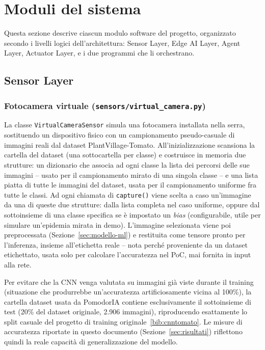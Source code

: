 \section{Moduli del sistema}
\label{sec:moduli}

Questa sezione descrive ciascun modulo software del progetto, organizzato
secondo i livelli logici dell'architettura: Sensor Layer, Edge AI Layer,
Agent Layer, Actuator Layer, e i due programmi che li orchestrano.

\subsection{Sensor Layer}

\subsubsection{Fotocamera virtuale (\texttt{sensors/virtual\_camera.py})}

La classe \texttt{VirtualCameraSensor} simula una fotocamera installata
nella serra, sostituendo un dispositivo fisico con un campionamento
pseudo-casuale di immagini reali dal dataset PlantVillage-Tomato.
All'inizializzazione scansiona la cartella del dataset (una sottocartella
per classe) e costruisce in memoria due strutture: un dizionario che
associa ad ogni classe la lista dei percorsi delle sue immagini -- usato
per il campionamento mirato di una singola classe -- e una lista piatta di
tutte le immagini del dataset, usata per il campionamento uniforme fra
tutte le classi. Ad ogni chiamata di \texttt{capture()} viene scelta a caso
un'immagine da una di queste due strutture: dalla lista completa nel caso
uniforme, oppure dal sottoinsieme di una classe specifica se è impostato un
\emph{bias} (configurabile, utile per simulare un'epidemia mirata in demo).
L'immagine selezionata viene poi preprocessata (Sezione~\ref{sec:modello-ml})
e restituita come tensore pronto per l'inferenza, insieme all'etichetta
reale -- nota perché proveniente da un dataset etichettato, usata solo per
calcolare l'accuratezza nel PoC, mai fornita in input alla rete.

\begin{notebox}
Per evitare che la CNN venga valutata su immagini già viste durante il
training (situazione che produrrebbe un'accuratezza artificiosamente vicina
al 100\%), la cartella dataset usata da PomodorIA contiene esclusivamente il
sottoinsieme di test (20\% del dataset originale, 2.906 immagini),
riproducendo esattamente lo split casuale del progetto di training
originale~\ref{bib:cnntomato}. Le misure di accuratezza riportate in
questo documento (Sezione~\ref{sec:risultati}) riflettono quindi la reale
capacità di generalizzazione del modello.
\end{notebox}

